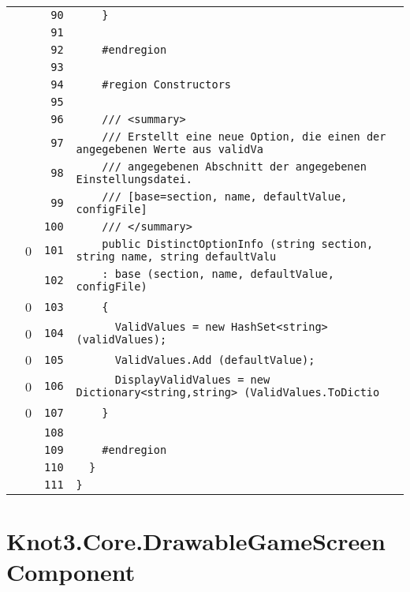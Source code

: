 \documentclass[a4paper,10pt]{article}
\begin{document}
\begin{longtable}[l]{lrrl}
\cellcolor{gray} &  & \verb~90~ & \verb~    }~\\
\cellcolor{gray} &  & \verb~91~ & \verb~~\\
\cellcolor{gray} &  & \verb~92~ & \verb~    #endregion~\\
\cellcolor{gray} &  & \verb~93~ & \verb~~\\
\cellcolor{gray} &  & \verb~94~ & \verb~    #region Constructors~\\
\cellcolor{gray} &  & \verb~95~ & \verb~~\\
\cellcolor{gray} &  & \verb~96~ & \verb~    /// <summary>~\\
\cellcolor{gray} &  & \verb~97~ & \verb~    /// Erstellt eine neue Option, die einen der angegebenen Werte aus validVa~\\
\cellcolor{gray} &  & \verb~98~ & \verb~    /// angegebenen Abschnitt der angegebenen Einstellungsdatei.~\\
\cellcolor{gray} &  & \verb~99~ & \verb~    /// [base=section, name, defaultValue, configFile]~\\
\cellcolor{gray} &  & \verb~100~ & \verb~    /// </summary>~\\
\cellcolor{red} & 0 & \verb~101~ & \verb~    public DistinctOptionInfo (string section, string name, string defaultValu~\\
\cellcolor{gray} &  & \verb~102~ & \verb~    : base (section, name, defaultValue, configFile)~\\
\cellcolor{red} & 0 & \verb~103~ & \verb~    {~\\
\cellcolor{red} & 0 & \verb~104~ & \verb~      ValidValues = new HashSet<string> (validValues);~\\
\cellcolor{red} & 0 & \verb~105~ & \verb~      ValidValues.Add (defaultValue);~\\
\cellcolor{red} & 0 & \verb~106~ & \verb~      DisplayValidValues = new Dictionary<string,string> (ValidValues.ToDictio~\\
\cellcolor{red} & 0 & \verb~107~ & \verb~    }~\\
\cellcolor{gray} &  & \verb~108~ & \verb~~\\
\cellcolor{gray} &  & \verb~109~ & \verb~    #endregion~\\
\cellcolor{gray} &  & \verb~110~ & \verb~  }~\\
\cellcolor{gray} &  & \verb~111~ & \verb~}~\\
\end{longtable}
\newpage
\section{Knot3.Core.DrawableGameScreenComponent}
\end{document}

